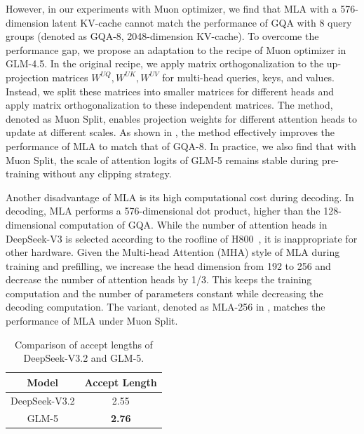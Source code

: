 However, in our experiments with Muon optimizer, we find that MLA with a 576-dimension latent KV-cache cannot match the performance of GQA with 8 query groups (denoted as GQA-8, 2048-dimension KV-cache). To overcome the performance gap, we propose an adaptation to the recipe of Muon optimizer in GLM-4.5.
In the original recipe, we apply matrix orthogonalization to the up-projection matrices $W^{UQ}, W^{UK}, W^{UV}$ for multi-head queries, keys, and values. Instead, we split these matrices into smaller matrices for different heads and apply matrix orthogonalization to these independent matrices. The method, denoted as Muon Split, enables projection weights for different attention heads to update at different scales. As shown in , the method effectively improves the performance of MLA to match that of GQA-8. In practice, we also find that with Muon Split, the scale of attention logits of GLM-5 remains stable during pre-training without any clipping strategy.

Another disadvantage of MLA is its high computational cost during decoding. In decoding, MLA performs a 576-dimensional dot product, higher than the 128-dimensional computation of GQA. While the number of attention heads in DeepSeek-V3 is selected according to the roofline of H800~\cite{zhao2025insights}, it is inappropriate for other hardware. Given the Multi-head Attention (MHA) style of MLA during training and prefilling, we increase the head dimension from 192 to 256 and decrease the number of attention heads by 1/3. This keeps the training computation
and the number of parameters constant while decreasing the decoding computation. The variant, denoted as MLA-256 in , matches the performance of MLA under Muon Split.

\begin{table}
    \centering
    \caption{Comparison of accept lengths of DeepSeek-V3.2 and GLM-5.}
    \label{tab:mtp}
    \begin{tabular}{c|c}
        \toprule
        Model  & Accept Length \\
        \midrule
        DeepSeek-V3.2 & 2.55 \\
        GLM-5  & \textbf{2.76}\\
        \bottomrule
    \end{tabular}
\end{table}

